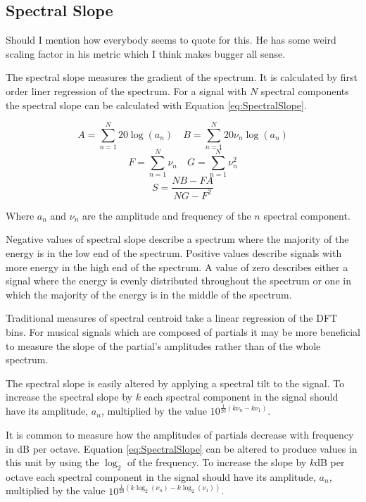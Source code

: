 	\subsection{Spectral Slope}
	\label{sec:FeatureControl-Parameterisation-Slope}
		\note
		{
			Should I mention how everybody seems to quote \citet{peeters2004a} for this. He has some weird
			scaling factor in his metric which I think makes bugger all sense.
		}

		The spectral slope measures the gradient of the spectrum. It is calculated by first order liner regression
		of the spectrum. For a signal with $N$ spectral components the spectral slope can be calculated with
		Equation \ref{eq:SpectralSlope}.

		\[ A = \sum_{n = 1}^{N} 20\log (a_{n}) \quad B = \sum_{n = 1}^{N} 20\nu_{n}\log (a_{n}) \]
		\[ F = \sum_{n = 1}^{N} \nu_{n} \quad G = \sum_{n = 1}^{N} \nu_{n}^{2} \]
		\begin{equation}
			S = \frac{NB - FA}
		                 {NG - F^{2}}
			\label{eq:SpectralSlope}
		\end{equation}

		Where $a_{n}$ and $\nu_{n}$ are the amplitude and frequency of the $n$ spectral component.

		Negative values of spectral slope describe a spectrum where the majority of the energy is in the low end of
		the spectrum. Positive values describe signals with more energy in the high end of the spectrum. A value of
		zero describes either a signal where the energy is evenly distributed throughout the spectrum or one in
		which the majority of the energy is in the middle of the spectrum.

		Traditional measures of spectral centroid take a linear regression of the DFT bins. For musical signals
		which are composed of partials it may be more beneficial to measure the slope of the partial's amplitudes
		rather than of the whole spectrum. 
		
		The spectral slope is easily altered by applying a spectral tilt to the signal. To increase the spectral
		slope by $k$ each spectral component in the signal should have its amplitude, $a_{n}$, multiplied by the
		value $10^{\frac{1}{20}(k\nu_{n} - k\nu_{1})}$.

		It is common to measure how the amplitudes of partials decrease with frequency in dB per octave. Equation
		\ref{eq:SpectralSlope} can be altered to produce values in this unit by using the $\log_{2}$ of the
		frequency. To increase the slope by $k$dB per octave each spectral component in the signal should have its
		amplitude, $a_{n}$, multiplied by the value $10^{\frac{1}{20}(k\log_{2}(\nu_{n}) - k\log_{2}(\nu_{1}))}$.

